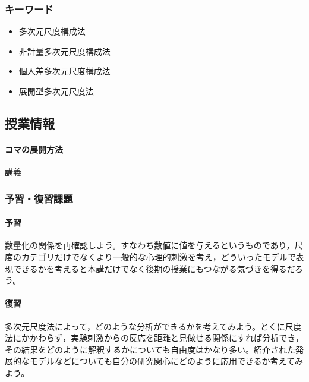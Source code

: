 \subsubsection{キーワード}
\begin{itemize}
	\item 多次元尺度構成法
	\item 非計量多次元尺度構成法
	\item 個人差多次元尺度構成法
	\item 展開型多次元尺度法
\end{itemize}
\subsection{授業情報}
\paragraph{コマの展開方法}
講義
\subsubsection{予習・復習課題}
\paragraph{予習}数量化の関係を再確認しよう。すなわち数値に値を与えるというものであり，尺度のカテゴリだけでなくより一般的な心理的刺激を考え，どういったモデルで表現できるかを考えると本講だけでなく後期の授業にもつながる気づきを得るだろう。
\paragraph{復習}多次元尺度法によって，どのような分析ができるかを考えてみよう。とくに尺度法にかかわらず，実験刺激からの反応を距離と見做せる関係にすれば分析でき，その結果をどのように解釈するかについても自由度はかなり多い。紹介された発展的なモデルなどについても自分の研究関心にどのように応用できるか考えてみよう。